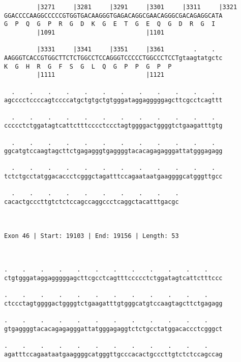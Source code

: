 \documentclass{article}
\begin{document}
\begin{Verbatim}
         |3271     |3281     |3291     |3301     |3311     |3321
GGACCCCAAGGCCCCCGTGGTGACAAGGGTGAGACAGGCGAACAGGGCGACAGAGGCATA
G  P  Q  G  P  R  G  D  K  G  E  T  G  E  Q  G  D  R  G  I  
         |1091                         |1101                
  
         |3331     |3341     |3351     |3361        .    .  
AAGGGTCACCGTGGCTTCTCTGGCCTCCAGGGTCCCCCTGGCCCTCCTgtaagtatgctc
K  G  H  R  G  F  S  G  L  Q  G  P  P  G  P  P              
         |1111                         |1121                
  
  .    .    .    .    .    .    .    .    .    .    .    .  
agcccctccccagtccccatgctgtgctgtgggataggagggggagcttcgcctcagttt
                                                            
  .    .    .    .    .    .    .    .    .    .    .    .  
ccccctctggatagtcattctttcccctccctagtggggactggggtctgaagatttgtg
                                                            
  .    .    .    .    .    .    .    .    .    .    .    .  
ggcatgtccaagtagcttctgagagggtgaggggtacacagagagggattatgggagagg
                                                            
  .    .    .    .    .    .    .    .    .    .    .    .  
tctctgcctatggacaccctcgggctagatttccagaataatgaaggggcatgggttgcc
                                                            
  .    .    .    .    .    .    .    .    .    .
cacactgcccttgtctctccagccaggccctcaggctacatttgacgc
                                                
                                                
 
Exon 46 | Start: 19103 | End: 19156 | Length: 53



.    .    .    .    .    .    .    .    .    .    .    .    
ctgtgggataggagggggagcttcgcctcagtttccccctctggatagtcattctttccc
                                                            
.    .    .    .    .    .    .    .    .    .    .    .    
ctccctagtggggactggggtctgaagatttgtgggcatgtccaagtagcttctgagagg
                                                            
.    .    .    .    .    .    .    .    .    .    .    .    
gtgaggggtacacagagagggattatgggagaggtctctgcctatggacaccctcgggct
                                                            
.    .    .    .    .    .    .    .    .    .    .    .    
agatttccagaataatgaaggggcatgggttgcccacactgcccttgtctctccagccag
                                                            

\end{Verbatim}
\end{document}
